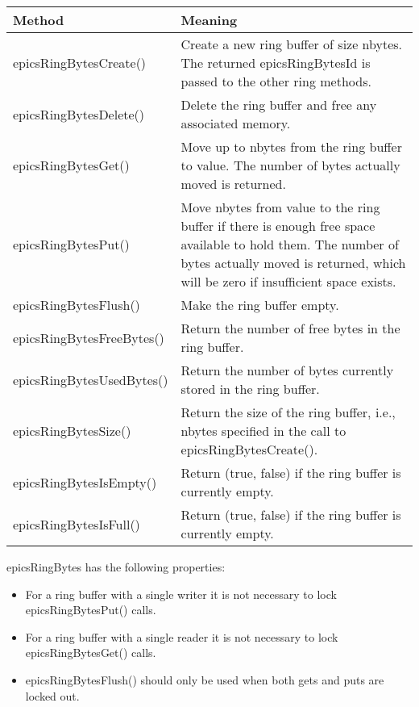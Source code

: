 \begin{center}
\begin{longtable}{p{1.6in}p{5.0in}}
\textbf{Method} & \textbf{Meaning}\\
\hline
epicsRingBytesCreate() & Create a new ring buffer of size nbytes. The returned epicsRingBytesId is passed to the other ring methods.\\
epicsRingBytesDelete() & Delete the ring buffer and free any associated memory.\\
epicsRingBytesGet() & Move up to nbytes from the ring buffer to value. The number of bytes actually moved is returned.\\
epicsRingBytesPut() & Move nbytes from value to the ring buffer if there is enough free space available to hold them. The number of bytes actually moved is returned, which will be zero if insufficient space exists.\\
epicsRingBytesFlush() & Make the ring buffer empty.\\
epicsRingBytesFreeBytes() & Return the number of free bytes in the ring buffer.\\
epicsRingBytesUsedBytes() & Return the number of bytes currently stored in the ring buffer.\\
epicsRingBytesSize() & Return the size of the ring buffer, i.e., nbytes specified in the call to epicsRingBytesCreate().\\
epicsRingBytesIsEmpty() & Return (true, false) if the ring buffer is currently empty.\\
epicsRingBytesIsFull() & Return (true, false) if the ring buffer is currently empty.
\end{longtable}

\end{center}


epicsRingBytes has the following properties:

\begin{itemize}
\item For a ring buffer with a single writer it is not necessary to lock epicsRingBytesPut() calls.

\item For a ring buffer with a single reader it is not necessary to lock epicsRingBytesGet() calls.

\item epicsRingBytesFlush() should only be used when both gets and puts are locked out.

\end{itemize}

